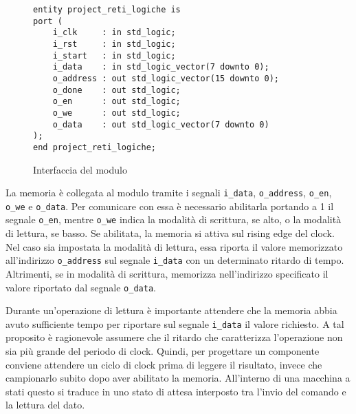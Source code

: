 \begin{figure}[!ht]
    \centering
    \begin{varwidth}{\linewidth}
        \begin{verbatim}
entity project_reti_logiche is
port (
    i_clk     : in std_logic;
    i_rst     : in std_logic;
    i_start   : in std_logic;
    i_data    : in std_logic_vector(7 downto 0);
    o_address : out std_logic_vector(15 downto 0);
    o_done    : out std_logic;
    o_en      : out std_logic;
    o_we      : out std_logic;
    o_data    : out std_logic_vector(7 downto 0)
);
end project_reti_logiche;
    \end{verbatim}
    \end{varwidth}
    \caption{Interfaccia del modulo}
    \label{code:interfacciacomponente}
\end{figure}

La memoria è collegata al modulo tramite i segnali \verb|i_data|, \verb|o_address|, \verb|o_en|, \verb|o_we| e \verb|o_data|. Per comunicare con essa è necessario abilitarla portando a 1 il segnale \verb|o_en|, mentre \verb|o_we| indica la modalità di scrittura, se alto, o la modalità di lettura, se basso. Se abilitata, la memoria si attiva sul rising edge del clock. Nel caso sia impostata la modalità di lettura, essa riporta il valore memorizzato all'indirizzo \verb|o_address| sul segnale \verb|i_data| con un determinato ritardo di tempo. Altrimenti, se in modalità di scrittura, memorizza nell'indirizzo specificato il valore riportato dal segnale \verb|o_data|.

Durante un'operazione di lettura è importante attendere che la memoria abbia avuto sufficiente tempo per riportare sul segnale \verb|i_data| il valore richiesto. A tal proposito è ragionevole assumere che il ritardo che caratterizza l'operazione non sia più grande del periodo di clock. Quindi, per progettare un componente conviene attendere un ciclo di clock prima di leggere il risultato, invece che campionarlo subito dopo aver abilitato la memoria. All'interno di una macchina a stati questo si traduce in uno stato di attesa interposto tra l'invio del comando e la lettura del dato.